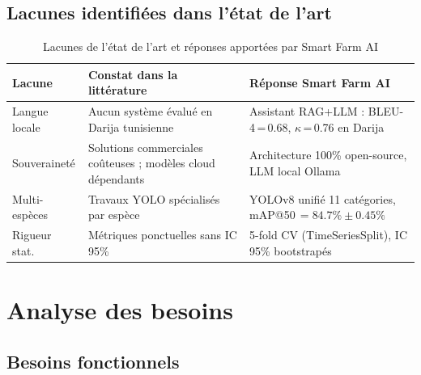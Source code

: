 \subsection{Lacunes identifiées dans l'état de l'art}

\begin{table}[H]
\centering
\caption{Lacunes de l'état de l'art et réponses apportées par Smart Farm AI}
\label{tab:lacunes_etat_art}
\begin{tabularx}{\linewidth}{lXX}
\toprule
\textbf{Lacune} & \textbf{Constat dans la littérature} & \textbf{Réponse Smart Farm AI} \\
\midrule
Langue locale &
  Aucun système évalué en Darija tunisienne~\cite{abbou2024arabic} &
  Assistant RAG+LLM : BLEU-4\,=\,0.68, $\kappa$\,=\,0.76 en Darija \\
\addlinespace
Souveraineté &
  Solutions commerciales coûteuses ; modèles cloud dépendants &
  Architecture 100\% open-source, LLM local Ollama \\
\addlinespace
Multi-espèces &
  Travaux YOLO spécialisés par espèce~\cite{chen2023yolo_livestock} &
  YOLOv8 unifié 11 catégories, mAP@50\,$= 84.7\% \pm 0.45\%$ \\
\addlinespace
Rigueur stat. &
  Métriques ponctuelles sans IC 95\%~\cite{liakos2018} &
  5-fold CV (TimeSeriesSplit), IC 95\% bootstrapés \\
\bottomrule
\end{tabularx}
\end{table}

\section{Analyse des besoins}

\subsection{Besoins fonctionnels}

